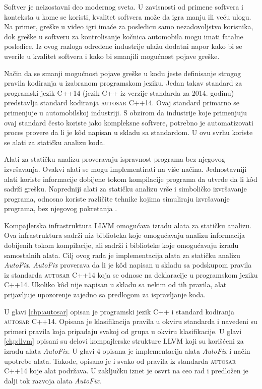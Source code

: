\documentclass[12pt,oneside]{memoir}
\begin{document}
Softver je neizostavni deo modernog sveta. U zavisnosti od primene softvera i konteksta u kome se koristi, kvalitet softvera mo\v{z}e da igra
manju ili ve\'{c}u ulogu. Na primer, gre\v{s}ke u video igri ima\'{c}e za posledicu samo nezadovoljstvo korisnika, dok gre\v{s}ke u softveru
za kontrolisanje ko\v{c}nica automobila mogu imati fatalne posledice. Iz ovog razloga određene industrije ula\v{z}u dodatni napor kako bi se uverile u kvalitet softvera
i kako bi smanjili mogu\'{c}nost pojave gre\v{s}ke. \par
Na\v{c}in da se smanji mogu\'{c}nost pojave gre\v{s}ke u kodu jeste definisanje strogog pravila kodiranja u izabranom programskom jeziku. Jedan takav standard za programski jezik C++14 (jezik C++ iz verzije standarda za 2014. godinu) predstavlja standard kodiranja \textsc{autosar} C++14. Ovaj standard primarno se primenjuje u automobilskoj industriji. S obzirom da industrije koje primenjuju ovaj standard \v{c}esto koriste jako kompleksne softvere, potrebno je automatizovati proces provere da li je k\^{o}d napisan u skladu sa standardom. U ovu svrhu koriste se alati za stati\v{c}ku analizu koda. \par Alati za stati\v{c}ku analizu proveravaju ispravnost programa bez njegovog izvr\v{s}avanja. Ovakvi alati se mogu implementirati na vi\v{s}e na\v{c}ina. Jednostavniji alati koriste informacije dobijene tokom kompilacije programa da utvrde da li k\^{o}d sadr\v{z}i gre\v{s}ku. Napredniji alati za stati\v{c}ku analizu vr\v{s}e i simboli\v{c}ko izvr\v{s}avanje programa, odnosno koriste razli\v{c}ite tehnike kojima simuliraju izvr\v{s}avanje programa, bez njegovog pokretanja \cite{Etran, AutoCheck}. \par
Kompajlerska infrastruktura LLVM omogu\'{c}ava izradu alata za stati\v{c}ku analizu. Ova infrastruktura sadr\v{z}i niz biblioteka koje omogu\'{c}avaju analizu informacija dobijenih tokom kompilacije, ali sadr\v{z}i i biblioteke koje omogu\'{c}avaju izradu samostalnih alata. Cilj ovog rada je implementacija alata za stati\v{c}ku analizu
\textit{AutoFix}. \textit{AutoFix} proverava da li je k\^{o}d napisan u skladu sa podskupom pravila iz standarda \textsc{autosar} C++14 koja se odnose na deklaracije u programskom jeziku C++14. Ukoliko k\^{o}d nije napisan u skladu sa nekim od tih pravila, alat prijavljuje upozorenje zajedno sa predlogom za ispravljanje koda. 

U glavi \ref{chp:autosar} opisan je programski jezik C++ i standard kodiranja \textsc{autosar} C++14. Opisana je klasifikacija pravila u okviru standarda i navedeni su primeri pravila koja pripadaju svakoj od grupa u okviru klasifikacije. U glavi \ref{chp:llvm} opisani su delovi kompajlerske strukture LLVM koji su kori\v{s}\'{c}eni za izradu alata \textit{AutoFix}. U glavi 4 opisana je implementacija alata \textit{AutoFix} i na\v{c}in upotrebe alata. Takođe, opisano je i svako od pravila iz standarda \textsc{autosar} C++14 koje alat podr\v{z}ava. U zaklju\v{c}ku iznet je osvrt na ceo rad i predlo\v{z}en je dalji tok razvoja alata \textit{AutoFix}.
\end{document}
